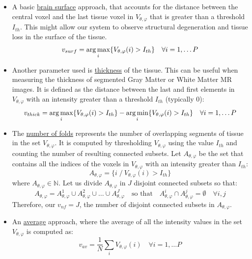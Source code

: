 \begin{itemize}
	\item A basic \underline{brain surface} approach, that accounts for the distance between the central voxel and the last tissue voxel in $V_{\theta,\varphi}$ that is greater than a threshold $I_{th}$. This might allow our system to observe structural degeneration and tissue loss in the surface of the tissue. 
	\begin{equation}\label{eq:surface}
	v_{surf}= \operatorname*{arg\,max}_i \lbrace V_{\theta,\varphi}(i)>I_{th}\rbrace \quad \forall i=1,\dots P
	\end{equation}  
	
	\item Another parameter used is \underline{thickness} of the tissue. This can be useful when measuring the thickness of segmented Gray Matter or White Matter MR images. It is defined as the distance between the last and first elements in $V_{\theta,\varphi}$
	with an intensity greater than a threshold $I_{th}$ (typically 0): 
	\begin{equation}\label{eq:thickness}
	v_{thick}=\operatorname*{arg\,max}_i \lbrace V_{\theta,\varphi}(i)>I_{th}\rbrace- \operatorname*{arg\,min}_i \lbrace V_{\theta,\varphi}(i)>I_{th}\rbrace
	\quad \forall i=1,\dots P
	\end{equation}  
	
	\item The \underline{number of folds} represents the number of overlapping segments of tissue in the set $V_{\theta,\varphi}$. It is computed by thresholding $V_{\theta,\varphi}$ using the value $I_{th}$ and counting the number of resulting connected subsets. Let $A_{\theta,\varphi}$ be the set that contains all the indices of the voxels in $V_{\theta,\varphi}$ with an intensity greater than $I_{th}$:
	\begin{equation}
	A_{\theta,\varphi} = \lbrace i \; / \: V_{\theta,\varphi}(i)>I_{th} \rbrace
	\end{equation}
	where $A_{\theta,\varphi} \in \mathbb{N}$. Let us divide $A_{\theta,\varphi}$ in $J$ disjoint connected subsets so that:
	\begin{equation}
	A_{\theta,\varphi} = A_{\theta,\varphi}^1 \cup A_{\theta,\varphi}^2 \cup \dots \cup A_{\theta,\varphi}^J \quad \text{so that} \quad A_{\theta,\varphi}^i \cap A_{\theta,\varphi}^j = \emptyset \quad \forall i,j
	\end{equation}
	Therefore, our $v_{nf}=J$, the number of disjoint connected subsets in $A_{\theta,\varphi}$.
	
	\item An \underline{average} approach, where the average of all the intensity values in the set $V_{\theta,\varphi}$ is computed as: 
	\begin{equation}\label{eq:mean}
	v_{av}=\frac{1}{N}\sum_i V_{\theta,\varphi}(i) \quad \forall i=1,\dots P
	\end{equation}  
	

\end{itemize}
